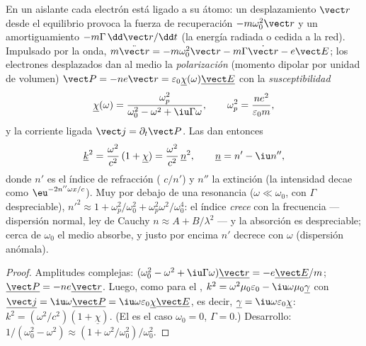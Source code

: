 \begin{proposition}\label{prop:b2:waves-in-media:lorentz}
En un aislante cada electrón está ligado a su átomo: un desplazamiento
$\vect r$ desde el equilibrio provoca la fuerza de recuperación $-m\omega_0^2\vect r$ y
un amortiguamiento $-m\Gamma\,\dd\vect r/\dd t$ (la energía radiada o cedida a la
red). Impulsado por la onda, $m\ddot{\vect r} = -m\omega_0^2\vect r - m\Gamma\dot{\vect r}
- e\vect E$; los electrones desplazados dan al medio la \emph{polarización}
(momento dipolar por unidad de volumen) $\vect P = -ne\vect r = \varepsilon_0\underline\chi(\omega)
\underline{\vect E}$ con la \emph{susceptibilidad}
\[
\underline\chi(\omega) = \frac{\omega_p^2}{\omega_0^2 - \omega^2 + \iu\Gamma\omega} ,
\qquad \omega_p^2 = \frac{ne^2}{\varepsilon_0m} ,
\]
y la corriente ligada $\vect j = \partial_t\vect P$. Las  dan entonces
\[
\underline k^2 = \frac{\omega^2}{c^2}\,(1 + \underline\chi) = \frac{\omega^2}{c^2}\,\underline n^2 ,
\qquad \underline n = n' - \iu n'' ,
\]
donde $n'$ es el índice de refracción ( $c/n'$) y $n''$ la
extinción (la intensidad decae como $\eu^{-2n''\omega x/c}$). Muy por debajo de una
resonancia ($\omega \ll \omega_0$, con $\Gamma$ despreciable), $n'^2 \approx 1 + \omega_p^2/\omega_0^2 +
\omega_p^2\omega^2/\omega_0^4$: el índice \emph{crece} con la frecuencia --- dispersión
normal, ley de Cauchy $n \approx A + B/\lambda^2$ --- y la absorción es
despreciable; cerca de $\omega_0$ el medio absorbe, y justo por encima $n'$
decrece con $\omega$ (dispersión anómala).
\end{proposition}

\begin{proof}
Amplitudes complejas: $(\omega_0^2 - \omega^2 + \iu\Gamma\omega)\underline{\vect r} = -e\underline{\vect E}
/m$; $\underline{\vect P} = -ne\underline{\vect r}$. Luego, como para el , $k^2 = \omega^2\mu_0
\varepsilon_0 - \iu\omega\mu_0\underline\gamma$ con $\underline{\vect j} = \iu\omega\underline{\vect P} = \iu\omega\varepsilon_0
\underline\chi\underline{\vect E}$, es decir, $\underline\gamma = \iu\omega\varepsilon_0\underline\chi$: $k^2 = (\omega^2/c^2)
(1 + \underline\chi)$. (El  es el caso $\omega_0 = 0$, $\Gamma = 0$.)
Desarrollo: $1/(\omega_0^2 - \omega^2) \approx (1 + \omega^2/\omega_0^2)/\omega_0^2$.
\end{proof}

